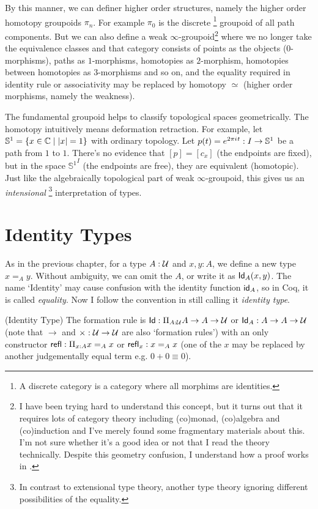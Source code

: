 By this manner, we can definer higher order structures, namely the higher
order homotopy groupoids $\pi_n$. For example $\pi_0$ is the discrete
\footnote{A discrete category is a category where all morphims are
identities.} groupoid of all path components. But we can also define a
weak $\infty$-groupoid\footnote{I have been trying hard to understand
this concept, but it turns out that it requires lots of category theory
including (co)monad, (co)algebra and (co)induction 
\cite{types-are-weak-groupoids} and I've merely found
some fragmentary materials about this. I'm not sure whether
it's a good idea or not that I read the theory technically. Despite
this geometry confusion, I understand how a proof works in 
\cite{homotopy-type-theory}.} where we no longer take the equivalence 
classes and that category consists of points as the objects 
($0$-morphisms), paths as $1$-morphisms, homotopies as $2$-morphism, 
homotopies between homotopies as $3$-morphisms and so on, and the
equality required in identity rule or associativity may be replaced by 
homotopy $\simeq$ (higher order morphisms, namely the weakness).
\newcommand{\sphere}{\mathbb{S}}

The fundamental groupoid helps to classify topological spaces
geometrically. The homotopy intuitively means deformation retraction.
For example, let $\sphere^1=\{x\in\complex\mid |x| = 1\}$ with ordinary 
topology. Let $p(t) = e^{2\pi\iu t}: I\to \sphere^1$ be a path from
$1$ to $1$. There's no evidence that $[p]=[c_x]$ (the endpoints are 
fixed), but in the space ${\sphere^1}^I$ (the endpoints are free), 
they are equivalent (homotopic). Just like the algebraically topological
part of weak $\infty$-groupoid, this gives us an {\it intensional}
\footnote{In contrast to extensional type theory, another type theory
ignoring different possibilities of the equality.} interpretation of types.

\section{Identity Types}

As in the previous chapter, for a type $A:\mathcal{U}$ and $x,y:A$,
we define a new type $x =_A y$. Without ambiguity, we can omit the $A$,
or write it as $\text{\sf Id}_A(x, y)$. The name `Identity' may cause confusion with
the identity function $\text{\sf id}_A$, so in Coq\cite{coq}, it is called {\it 
equality}. Now I follow the convention in \cite{homotopy-type-theory} still
calling it {\it identity type}.

\begin{definition}
    \label{identity-type}
    (Identity Type) The formation rule is 
    $\text{\sf Id}: \Pi_{A:\mathcal{U}}A\to A\to\mathcal{U}$ or $\text{\sf Id}_A: A\to A\to \mathcal{U}$ 
    (note that $\to$ and $\times: \mathcal{U}\to\mathcal{U}$ are also 
    `formation rules') with an only constructor 
    $\text{\sf refl}:\Pi_{x:A}x=_A x$ or $\text{\sf refl}_x: x=_A x$ (one of the $x$ may
    be replaced by another judgementally equal term e.g. $0+0\equiv 0$).
\end{definition}

